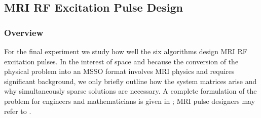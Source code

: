 \documentclass[final]{siamltex}
\begin{document}
\subsection{MRI RF Excitation Pulse Design}
\label{subsec:e3}

   \subsubsection{Overview} For the final experiment we study how well
   the six algorithms design MRI RF excitation pulses.  In the
   interest of space and because the conversion of the physical
   problem into an MSSO format involves MRI physics and requires
   significant background, we only briefly outline how the system
   matrices arise and why simultaneously sparse solutions are
   necessary.  A complete formulation of the problem for engineers and
   mathematicians is given in \cite{Zel2008_CISS}; MRI pulse designers
   may refer to \cite{Zel2008_TMI}.
\end{document}
